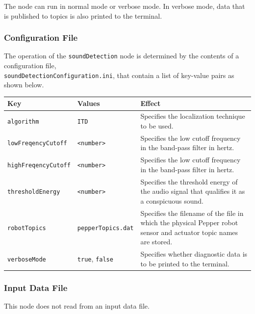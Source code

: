 \documentclass{CSSRforAfrica}
\begin{document}
{{The node can run in normal mode or verbose mode. In verbose mode, data that is published to topics is also printed to the terminal.

\subsubsection*{Configuration File}

The operation of the {\small \verb+soundDetection+} node is determined by the contents of a configuration file, \\
{\small \texttt{soundDetectionConfiguration.ini}},  that  contain a list of key-value pairs as shown below.  

\begin{center}
\begin{tabularx}{\linewidth}{| l | l | X|}
\hline 
{\small Key }                               & {\small Values }                                                 &  {\small Effect}       \\
\hline
{\footnotesize \verb+algorithm+ }  & {\footnotesize \verb+ITD+}     & {\small Specifies the localization technique to be used.} \\ 
\hline
{\footnotesize \verb+lowFreqencyCutoff+ }  & {\footnotesize \verb+<number>+}     & {\small Specifies the low cutoff frequency in the band-pass filter in hertz.} \\ 
\hline
{\footnotesize \verb+highFreqencyCutoff+ }  & {\footnotesize \verb+<number>+}     & {\small Specifies the low cutoff frequency in the band-pass filter in hertz.} \\ 
\hline
{\footnotesize \verb+thresholdEnergy+ }  & {\footnotesize \verb+<number>+}     & {\small Specifies the threshold energy of the audio signal that qualifies it as a conspicuous sound.} \\ 
\hline
{\footnotesize \verb+robotTopics+ }  & {\footnotesize \verb+pepperTopics.dat+}     & {\small Specifies the filename of the file in which the physical Pepper robot sensor and actuator topic names are stored.} \\
\hline
{\footnotesize \verb+verboseMode+}  & {\footnotesize \verb+true+, \verb+false+}     & {\small Specifies whether diagnostic data is to be printed to the terminal.} \\
\hline
\end{tabularx}
\end{center}


\subsubsection*{Input Data File}
This node does not read from an input data file.


}}
\end{document}
